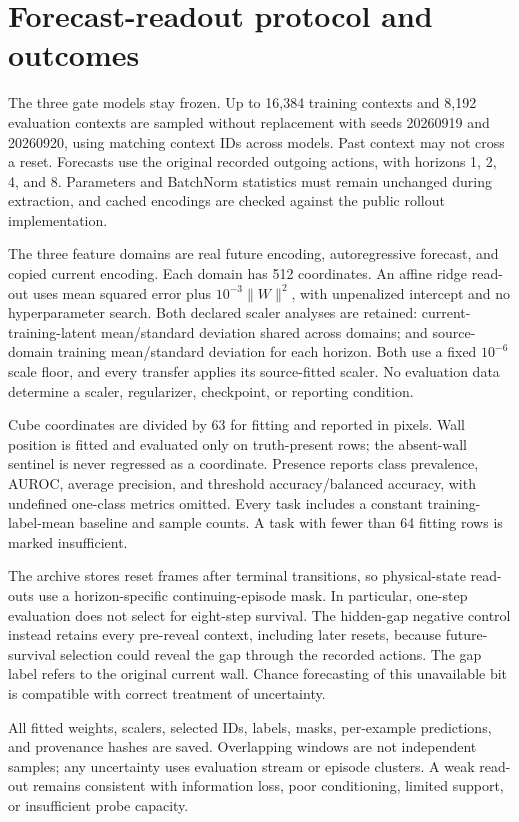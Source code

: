 \section{Forecast-readout protocol and outcomes}
\label{app:forecast}
The three gate models stay frozen. Up to 16,384 training contexts and 8,192 evaluation contexts are
sampled without replacement with seeds 20260919 and 20260920, using matching context IDs across
models. Past context may not cross a reset. Forecasts use the original recorded outgoing actions,
with horizons 1, 2, 4, and 8. Parameters and BatchNorm statistics must remain unchanged during
extraction, and cached encodings are checked against the public rollout implementation.

The three feature domains are real future encoding, autoregressive forecast, and copied current
encoding. Each domain has 512 coordinates. An affine ridge read-out uses mean squared error plus
$10^{-3}\|W\|^2$, with unpenalized intercept and no hyperparameter search. Both declared scaler
analyses are retained: current-training-latent mean/standard deviation shared across domains; and
source-domain training mean/standard deviation for each horizon. Both use a fixed $10^{-6}$ scale
floor, and every transfer applies its source-fitted scaler. No evaluation data determine a scaler,
regularizer, checkpoint, or reporting condition.

Cube coordinates are divided by 63 for fitting and reported in pixels. Wall position is fitted and
evaluated only on truth-present rows; the absent-wall sentinel is never regressed as a coordinate.
Presence reports class prevalence, AUROC, average precision, and threshold accuracy/balanced
accuracy, with undefined one-class metrics omitted. Every task includes a constant training-label-mean
baseline and sample counts. A task with fewer than 64 fitting rows is marked insufficient.

The archive stores reset frames after terminal transitions, so physical-state read-outs use a
horizon-specific continuing-episode mask. In particular, one-step evaluation does not select for
eight-step survival. The hidden-gap negative control instead retains every pre-reveal context,
including later resets, because future-survival selection could reveal the gap through the recorded
actions. The gap label refers to the original current wall. Chance forecasting of this unavailable
bit is compatible with correct treatment of uncertainty.

All fitted weights, scalers, selected IDs, labels, masks, per-example predictions, and provenance
hashes are saved. Overlapping windows are not independent samples; any uncertainty uses evaluation
stream or episode clusters. A weak read-out remains consistent with information loss, poor
conditioning, limited support, or insufficient probe capacity.


